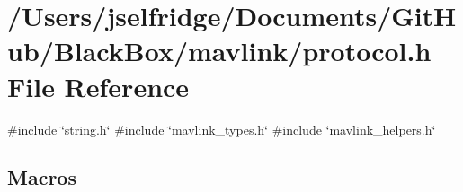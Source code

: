 \section{/\+Users/jselfridge/\+Documents/\+Git\+Hub/\+Black\+Box/mavlink/protocol.h File Reference}
\label{protocol_8h}
{\ttfamily \#include \char`\"{}string.\+h\char`\"{}}\newline
{\ttfamily \#include \char`\"{}mavlink\+\_\+types.\+h\char`\"{}}\newline
{\ttfamily \#include \char`\"{}mavlink\+\_\+helpers.\+h\char`\"{}}\newline
\subsection*{Macros}
